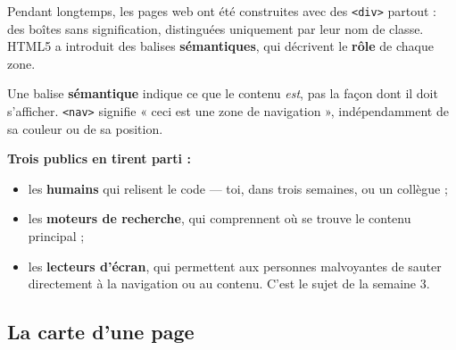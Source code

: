 \documentclass[a4paper,11pt]{article}
\begin{document}
Pendant longtemps, les pages web ont été construites avec des \texttt{<div>} partout : des boîtes sans signification, distinguées uniquement par leur nom de classe. HTML5 a introduit des balises \textbf{sémantiques}, qui décrivent le \textbf{rôle} de chaque zone.

\begin{tcolorbox}[definition, title={Définition --- Sémantique}]
Une balise \textbf{sémantique} indique ce que le contenu \textit{est}, pas la façon dont il doit s'afficher. \texttt{<nav>} signifie « ceci est une zone de navigation », indépendamment de sa couleur ou de sa position.
\end{tcolorbox}

\vspace{4pt}
\noindent\textbf{Trois publics en tirent parti :}

\begin{itemize}
  \item les \textbf{humains} qui relisent le code --- toi, dans trois semaines, ou un collègue ;
  \item les \textbf{moteurs de recherche}, qui comprennent où se trouve le contenu principal ;
  \item les \textbf{lecteurs d'écran}, qui permettent aux personnes malvoyantes de sauter directement à la navigation ou au contenu. C'est le sujet de la semaine 3.
\end{itemize}

\subsection{La carte d'une page}
\end{document}
